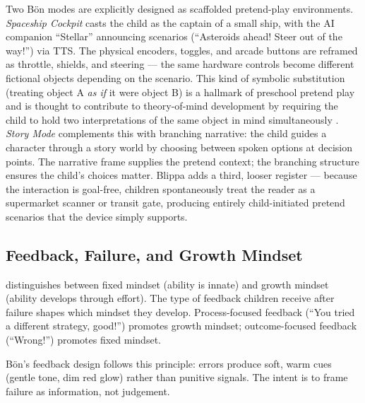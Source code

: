 \documentclass[12pt, a4paper]{article}
\newcommand{\Bodn}{B\"o\dh{}n}
\begin{document}
Two \Bodn{} modes are explicitly designed as scaffolded pretend-play
environments. \emph{Spaceship Cockpit} casts the child as the captain of a
small ship, with the AI companion ``Stellar'' announcing scenarios (``Asteroids
ahead! Steer out of the way!'') via TTS. The physical encoders, toggles, and
arcade buttons are reframed as throttle, shields, and steering --- the same
hardware controls become different fictional objects depending on the scenario.
This kind of symbolic substitution (treating object A \emph{as if} it were
object B) is a hallmark of preschool pretend play and is thought to contribute
to theory-of-mind development by requiring the child to hold two
interpretations of the same object in mind simultaneously
\citep{lillard2013impact}. \emph{Story Mode} complements this with branching
narrative: the child guides a character through a story world by choosing
between spoken options at decision points. The narrative frame supplies the
pretend context; the branching structure ensures the child's choices matter.
Blippa adds a third, looser register --- because the interaction is goal-free,
children spontaneously treat the reader as a supermarket scanner or transit
gate, producing entirely child-initiated pretend scenarios that the device
simply supports.

\subsection{Feedback, Failure, and Growth Mindset}
\label{sec:mindset}

\citet{dweck2006mindset} distinguishes between fixed mindset (ability is innate)
and growth mindset (ability develops through effort). The type of feedback
children receive after failure shapes which mindset they develop. Process-focused
feedback (``You tried a different strategy, good!'') promotes growth mindset;
outcome-focused feedback (``Wrong!'') promotes fixed mindset.

\Bodn{}'s feedback design follows this principle: errors produce soft, warm cues
(gentle tone, dim red glow) rather than punitive signals. The intent is to
frame failure as information, not judgement.
\end{document}
